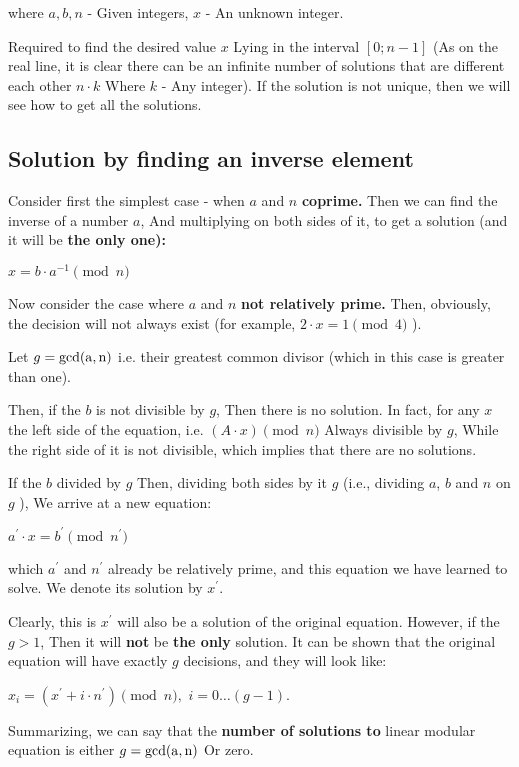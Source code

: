 where $a, b, n$ - Given integers, $x$ - An unknown integer.

Required to find the desired value $x$ Lying in the interval $[0; n-1]$ (As on the real line, it is clear there can be an infinite number of solutions that are different each other $n \cdot k$ Where $k$ - Any integer). If the solution is not unique, then we will see how to get all the solutions.

\subsection{ Solution by finding an inverse element }

Consider first the simplest case - when $a$ and $n$ \textbf{coprime.} Then we can find the inverse of a number $a$, And multiplying on both sides of it, to get a solution (and it will be \textbf{the only one):}

$x = b \cdot a ^ {-1} \pmod n$

Now consider the case where $a$ and $n$ \textbf{not relatively prime.} Then, obviously, the decision will not always exist (for example, $2 \cdot x = 1 \pmod 4$ ).

Let $g = {\rm gcd (a, n)}$ i.e. their greatest common divisor (which in this case is greater than one).

Then, if the $b$ is not divisible by $g$, Then there is no solution. In fact, for any $x$ the left side of the equation, i.e. $(A \cdot x) \pmod n$ Always divisible by $g$, While the right side of it is not divisible, which implies that there are no solutions.

If the $b$ divided by $g$ Then, dividing both sides by it $g$ (i.e., dividing $a$, $b$ and $n$ on $g$ ), We arrive at a new equation:

$a ^ \prime \cdot x = b ^ \prime \pmod {n ^ \prime}$

which $a ^ \prime$ and $n ^ \prime$ already be relatively prime, and this equation we have learned to solve. We denote its solution by $x ^ \prime$.

Clearly, this is $x ^ \prime$ will also be a solution of the original equation. However, if the $g> 1$, Then it will \textbf{not} be \textbf{the only} solution. It can be shown that the original equation will have exactly $g$ decisions, and they will look like:

$x_i = (x ^ \prime + i \cdot n ^ \prime) \pmod n,$
$i = 0 \ldots (g-1).$

Summarizing, we can say that the \textbf{number of solutions to} linear modular equation is either $g = {\rm gcd (a, n)}$ Or zero.

